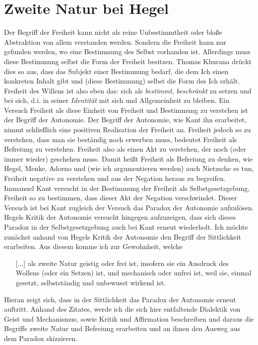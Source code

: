 \documentclass[12pt, a4paper, openany]{report}
\begin{document}
\section{Zweite Natur bei Hegel}\label{abschnitt_1}
Der Begriff der Freiheit kann nicht als reine Unbestimmtheit oder bloße Abstraktion von allem verstanden werden. 
Sondern die Freiheit kann nur gefunden werden, wo eine Bestimmung des Selbst vorhanden ist.
Allerdings muss diese Bestimmung selbst die Form der Freiheit besitzen. 
Thomas Khurana drückt dies so aus, dass das Subjekt einer Bestimmung bedarf, die dem Ich einen konkreten Inhalt gibt und (diese Bestimmung) selbst die Form des Ich erhält. 
Freiheit des Willens ist also eben das: sich \glqq als \textit{bestimmt}, \textit{beschränkt} zu setzen und bei sich, d.i. in seiner \textit{Identität} mit sich und Allgemeinheit zu bleiben.\grqq{}
Ein Versuch Freiheit als diese Einheit von Freiheit und Bestimmung zu verstehen ist der Begriff der Autonomie. 
Der Begriff der Autonomie, wie Kant ihn erarbeitet, nimmt schließlich eine positiven Realisation der Freiheit an.
Freiheit jedoch so zu verstehen, dass man sie beständig noch erwerben muss, bedeutet Freiheit als Befreiung zu verstehen. 
Freiheit also als einen Akt zu verstehen, der noch (oder immer wieder) geschehen muss.
Damit heißt Freiheit als Befreiung zu denken, wie Hegel, Menke, Adorno und (wie ich argumentieren werden) auch Nietzsche es tun, Freiheit negative zu verstehen und aus der Negation heraus zu begreifen.
Immanuel Kant versucht in der Bestimmung der Freiheit als Selbstgesetzgebung, Freiheit so zu bestimmen, dass dieser Akt der Negation verschwindet. 
Dieser Versuch ist bei Kant zugleich der Versuch das Paradox der Autonomie aufzulösen. 
Hegels Kritik der Autonomie versucht hingegen aufzuzeigen, dass sich dieses Paradox in der Selbstgesetzgebung auch bei Kant erneut wiederholt.
Ich möchte zunächst anhand von Hegels Kritik der Autonomie den Begriff der Sittlichkeit erarbeiten.
Aus diesem komme ich zur Gewohnheit, welche
\begin{itemize}
    \item[] [...] als zweite Natur geistig oder frei ist, insofern sie ein Ausdruck des Wollens (oder ein Setzen) ist, und mechanisch oder unfrei ist, weil sie, einmal gesetzt, selbstständig und unbewusst wirkend ist.
\end{itemize}
Hieran zeigt sich, dass in der Sittlichkeit das Paradox der Autonomie erneut auftritt. 
Anhand des Zitates, werde ich die sich hier entfaltende Dialektik von Geist und Mechanismus, sowie Kritik und Affirmation beschreiben und daraus die Begriffe zweite Natur und Befreiung erarbeiten und an ihnen den Ausweg aus dem Paradox skizzieren.
\end{document}
